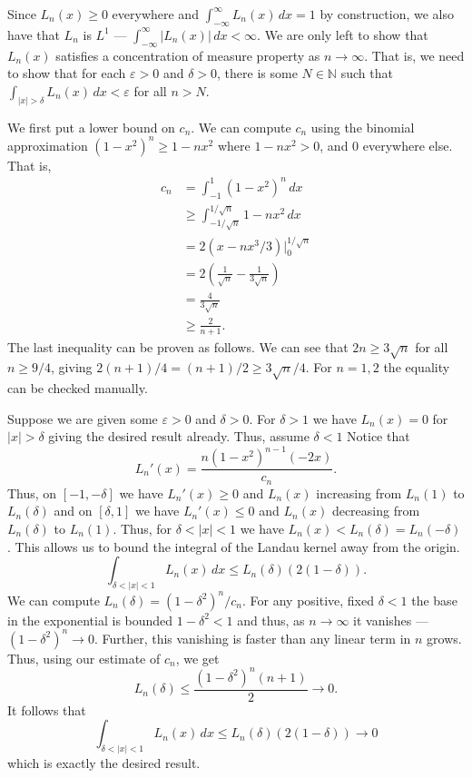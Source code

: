 \documentclass[12 pt, letterpaper]{hmcpset}
\begin{document}
\begin{solution}
	Since $L_{n}(x) \ge 0$ everywhere and $\int_{-\infty}^{\infty} L_{n}(x) \, dx = 1$ by construction, we also have that $L_{n}$ is $L^{1}$ --- $\int_{-\infty}^{\infty} \lvert L_{n}(x) \rvert \, dx < \infty$. We are only left to show that $L_{n}(x)$ satisfies a concentration of measure property as $n \to \infty$. That is, we need to show that for each $\varepsilon > 0$ and $\delta > 0$, there is some $N \in \mathbb{N}$ such that $\int_{\lvert x \rvert > \delta} L_{n}(x) \, dx < \varepsilon$ for all $n > N$.

	We first put a lower bound on $c_{n}$. We can compute $c_{n}$ using the binomial approximation $(1 - x^{2})^{n} \ge 1 - n x^{2}$ where $1 - n x^{2} > 0$, and $0$ everywhere else. That is,
	\begin{align*}
		c_{n} & = \int_{-1}^{1} (1 - x^{2})^{n} \, dx \\
		      & \ge \int_{-1/\sqrt{n}}^{1/\sqrt{n}} 1 - n x^{2} \, dx \\
		      & = 2 (x - n x^{3}/3) \Big |_{0}^{1/\sqrt{n}} \\
		      & = 2 \left ( \frac{1}{\sqrt{n}} - \frac{1}{3 \sqrt{n}} \right ) \\
		      & = \frac{4}{3 \sqrt{n}} \\
		      & \ge \frac{2}{n + 1}.
	\end{align*}
	The last inequality can be proven as follows. We can see that $2n \ge 3 \sqrt{n}$ for all $n \ge 9/4$, giving $2(n + 1)/4 = (n + 1) / 2 \ge 3 \sqrt{n} / 4$. For $n = 1, 2$ the equality can be checked manually.

	Suppose we are given some $\varepsilon > 0$ and $\delta > 0$. For $\delta > 1$ we have $L_{n}(x) = 0$ for $\lvert x \rvert > \delta$ giving the desired result already. Thus, assume $\delta < 1$ Notice that
	\[
		L_{n}'(x) = \frac{n (1 - x^{2})^{n - 1} (-2x)}{c_{n}}.
	\]
	Thus, on  $[-1, -\delta]$ we have $L_{n}'(x) \ge 0$ and $L_{n}(x)$ increasing from $L_{n}(1)$ to $L_{n}(\delta)$ and on $[\delta, 1]$ we have $L_{n}'(x) \le 0$ and $L_{n}(x)$ decreasing from $L_{n}(\delta)$ to $L_{n}(1)$. Thus, for $\delta < \lvert x \rvert < 1$ we have $L_{n}(x) < L_{n}(\delta) = L_{n}(-\delta)$. This allows us to bound the integral of the Landau kernel away from the origin.
	\[
		\int_{\delta < \lvert x \rvert < 1} L_{n}(x) \, dx \le L_{n}(\delta) (2 (1 - \delta)).
	\]
	We can compute $L_{n}(\delta) = (1 - \delta^{2})^{n} / c_{n}$. For any positive, fixed $\delta < 1$ the base in the exponential is bounded $1 - \delta^{2} < 1$ and thus, as $n \to \infty$ it vanishes --- $(1 - \delta^{2})^{n} \to 0$. Further, this vanishing is faster than any linear term in $n$ grows. Thus, using our estimate of $c_{n}$, we get
	\[
		L_{n}(\delta) \le \frac{(1 - \delta^{2})^{n} (n + 1)}{2} \to 0.
	\]
	It follows that
	\[
		\int_{\delta < \lvert x \rvert < 1} L_{n}(x) \, dx \le L_{n}(\delta) (2 (1 - \delta)) \to 0
	\]
	which is exactly the desired result.
\end{solution}
\pagebreak
\end{document}
